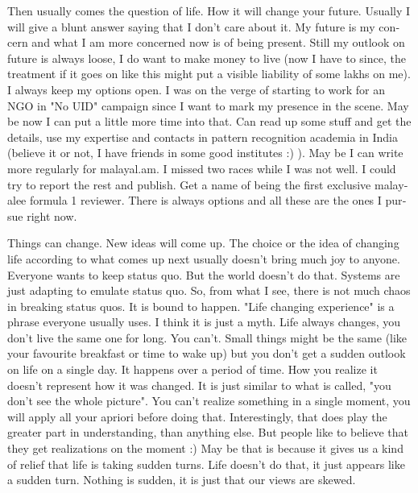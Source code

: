 \begin{english}
Then usually comes the question of life. How it will change your future. Usually I will give a 
blunt answer saying that I don't care about it. My future is my concern and what I am more concerned now 
is of being present. Still my outlook on future is always loose, I do want to make money to live (now 
I have to since, the treatment if it goes on like this might put a visible liability of some lakhs 
on me). I always keep my options open. I was on the verge of starting to work for an NGO in "No UID" campaign 
since I want to mark my presence in the scene. May be now I can put a little more time into that. Can 
read up some stuff and get the details, use my expertise and contacts in pattern recognition academia in India
(believe it or not, I have friends in some good institutes :) ). May be I can write more regularly 
for malayal.am. I missed two races while I was not well. I could try to report the rest and publish. 
Get a name of being the first exclusive malayalee formula 1 reviewer. There is always options and 
all these are the ones I pursue right now. 

Things can change. New ideas will come up. The choice or the idea of changing life according to 
what comes up next usually doesn't bring much joy to anyone. Everyone wants to keep status quo. 
But the world doesn't do that. Systems are just adapting to emulate status quo. So, from what I see, 
there is not much chaos in breaking status quos. It is bound to happen. "Life changing experience" is 
a phrase everyone usually uses. I think it is just a myth. Life always changes, you don't live the same 
one for long. You can't. Small things might be the same (like your favourite breakfast or time to wake up) 
but you don't get a sudden outlook on life on a single day. It happens over a period of time. How you
realize it doesn't represent how it was changed. It is just similar to what is called, "you don't see 
the whole picture". You can't realize something in a single moment, you will apply all your apriori 
before doing that. Interestingly, that does play the greater part in understanding, than anything 
else. But people like to believe that they get realizations on the moment :) May be that is because it gives us a kind 
of relief that life is taking sudden turns. Life doesn't do that, it just appears like a sudden turn. 
Nothing is sudden, it is just that our views are skewed.
\end{english}
\newpage 
